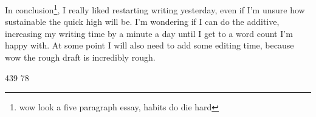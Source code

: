 \documentclass[12pt]{article}[titlepage]
\newcommand{\1}{\={a}}
\newcommand{\2}{\={e}}
\newcommand{\3}{\={\i}}
\newcommand{\4}{\=o}
\newcommand{\5}{\=u}
\newcommand{\6}{\={A}}
\renewcommand{\,}{\textsuperscript{,}}
\begin{document}
In conclusion\footnote{wow look a five paragraph essay, habits do die hard}, I really liked restarting writing yesterday, even if I'm unsure how sustainable the quick high will be.
I'm wondering if I can do the additive, increasing my writing time by a minute a day until I get to a word count I'm happy with.
At some point I will also need to add some editing time, because wow the rough draft is incredibly rough.

439
78
\end{document}
